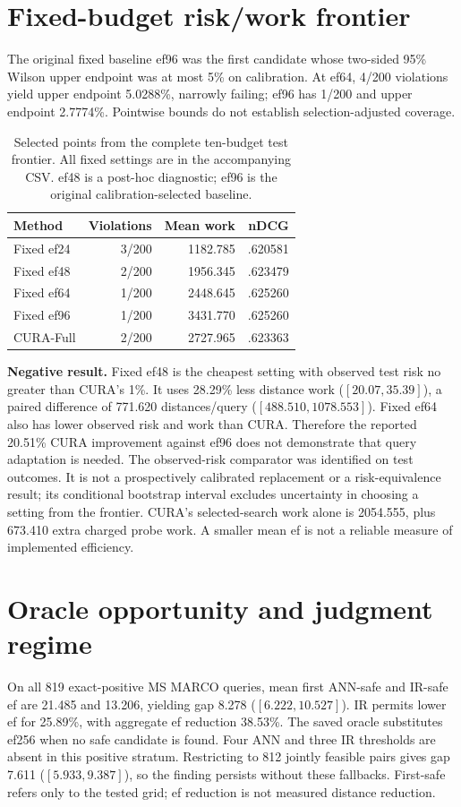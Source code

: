 \documentclass[10pt,twocolumn]{article}
\begin{document}
\section{Fixed-budget risk/work frontier}
The original fixed baseline ef96 was the first candidate whose two-sided 95\% Wilson upper endpoint was at most 5\% on calibration. At ef64, 4/200 violations yield upper endpoint 5.0288\%, narrowly failing; ef96 has 1/200 and upper endpoint 2.7774\%. Pointwise bounds do not establish selection-adjusted coverage.

\begin{table}[t]
\centering\small
\begin{tabular}{lrrr}
\toprule
Method & Violations & Mean work & nDCG\\
\midrule
Fixed ef24 & 3/200 & 1182.785 & .620581\\
Fixed ef48 & 2/200 & 1956.345 & .623479\\
Fixed ef64 & 1/200 & 2448.645 & .625260\\
Fixed ef96 & 1/200 & 3431.770 & .625260\\
CURA-Full & 2/200 & 2727.965 & .623363\\
\bottomrule
\end{tabular}
\caption{Selected points from the complete ten-budget test frontier. All fixed settings are in the accompanying CSV. ef48 is a post-hoc diagnostic; ef96 is the original calibration-selected baseline.}
\end{table}

\textbf{Negative result.} Fixed ef48 is the cheapest setting with observed test risk no greater than CURA's 1\%. It uses 28.29\% less distance work ($[20.07,35.39]$), a paired difference of 771.620 distances/query ($[488.510,1078.553]$). Fixed ef64 also has lower observed risk and work than CURA.
Therefore the reported 20.51\% CURA improvement against ef96 does not demonstrate that query adaptation is needed.
The observed-risk comparator was identified on test outcomes. It is not a prospectively calibrated replacement or a risk-equivalence result; its conditional bootstrap interval excludes uncertainty in choosing a setting from the frontier.
CURA's selected-search work alone is 2054.555, plus 673.410 extra charged probe work. A smaller mean ef is not a reliable measure of implemented efficiency.

\section{Oracle opportunity and judgment regime}
On all 819 exact-positive MS MARCO queries, mean first ANN-safe and IR-safe ef are 21.485 and 13.206, yielding gap 8.278 ($[6.222,10.527]$). IR permits lower ef for 25.89\%, with aggregate ef reduction 38.53\%.
The saved oracle substitutes ef256 when no safe candidate is found. Four ANN and three IR thresholds are absent in this positive stratum. Restricting to 812 jointly feasible pairs gives gap 7.611 ($[5.933,9.387]$), so the finding persists without these fallbacks. First-safe refers only to the tested grid; ef reduction is not measured distance reduction.
\end{document}
